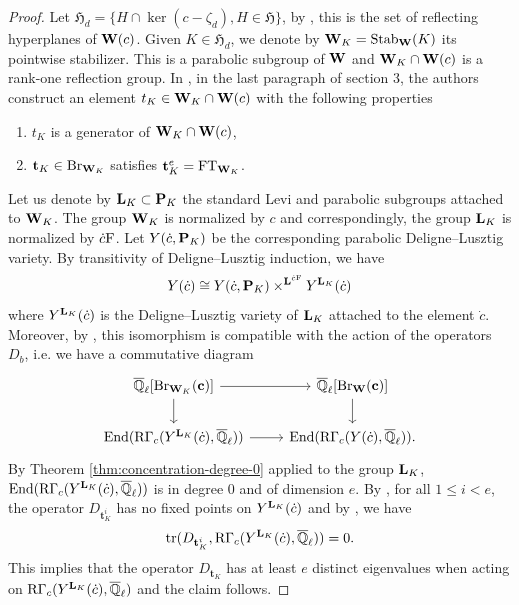 \documentclass[article, 10pt, oneside, reqno]{amsart}
\theoremstyle{plain}
\theoremstyle{definition}
\theoremstyle{remark}
\newcommand{\FT}{\mathrm{FT}}
\newcommand{\Hfrak}{\mathfrak{H}}
\newcommand{\cbf}{\mathbf{c}}
\newcommand{\tbf}{\mathbf{t}}
\begin{document}
\begin{proof}
Let $\Hfrak_d = \{H \cap \ker(c - \zeta_d), H \in \Hfrak \}$, by \cite{SpringerRegularElements}, this is the set of reflecting hyperplanes of $\mathbf{W}(c)$. Given $K \in \Hfrak_d$, we denote by $\mathbf{W}_{K} = \mathrm{Stab}_{\mathbf{W}}(K)$ its pointwise stabilizer. This is a parabolic subgroup of $\mathbf{W}$ and $\mathbf{W}_K \cap \mathbf{W}(c)$ is a rank-one reflection group. In \cite{DigneMichelEndomorphism}, in the last paragraph of section 3, the authors construct an element $t_K \in \mathbf{W}_K \cap \mathbf{W}(c)$ with the following properties 
\begin{enumerate}
\item $t_K$ is a generator of $\mathbf{W}_K \cap \mathbf{W}(c)$, 
\item $\tbf_K \in \Br_{\Wbf_K}$ satisfies $\tbf_K^e = \FT_{\Wbf_K}$.
\end{enumerate}
Let us denote by $\mathbf{L}_K \subset \mathbf{P}_K$ the standard Levi and parabolic subgroups attached to $\mathbf{W}_K$. The group $\mathbf{W}_K$ is normalized by $c$ and correspondingly, the group $\mathbf{L}_K$ is normalized by $\dot{c}\mathrm{F}$. Let $Y(\dot{c}, \mathbf{P}_K)$ be the corresponding parabolic Deligne--Lusztig variety. By transitivity of Deligne--Lusztig induction, we have 
$$Y(\dot{c}) \cong Y(\dot{c}, \mathbf{P}_K) \times^{\mathbf{L}^{\dot{c}\mathrm{F}}} Y^{\mathbf{L}_K}(\dot{c})$$ 
where $Y^{\mathbf{L}_K}(\dot{c})$ is the Deligne--Lusztig variety of $\mathbf{L}_K$ attached to the element $\dot{c}$. Moreover, by \cite[Proposition 5.2.8]{DigneMichelRouquier}, this isomorphism is compatible with the action of the operators $D_b$, i.e. we have a commutative diagram 
\[\begin{tikzcd}
	{\Qlb[\Br_{\Wbf_K}(\cbf)]} & {\Qlb[\Br_{\Wbf}(\cbf)]} \\
	{\End(\RGamma_c(Y^{\Lbf_K}(\dot{c}), \Qlb))} & {\End(\RGamma_c(Y(\dot{c}), \Qlb)).}
	\arrow[from=1-1, to=1-2]
	\arrow[from=1-1, to=2-1]
	\arrow[from=1-2, to=2-2]
	\arrow[from=2-1, to=2-2]
\end{tikzcd}\]
By Theorem \ref{thm:concentration-degree-0} applied to the group $\mathbf{L}_K$, $\mathrm{End}(\mathrm{R\Gamma}_c(Y^{\mathbf{L}_K}(\dot{c}), \overline{\mathbb{Q}}_{\ell}))$ is in degree $0$ and of dimension $e$. By \cite[Proposition 5.2.3]{DigneMichelRouquier}, for all $1 \leq i < e$, the operator $D_{\tbf_K^i}$ has no fixed points on $Y^{\mathbf{L}_K}(\dot{c})$ and by \cite[Proposition 5.2.2]{DigneMichelRouquier}, we have 
$$\tr(D_{\tbf_K^i}, \RGamma_c(Y^{\Lbf_K}(\dot{c}), \Qlb)) = 0.$$
This implies that the operator $D_{\tbf_K}$ has at least $e$ distinct eigenvalues when acting on $\mathrm{R\Gamma}_c(Y^{\mathbf{L}_K}(\dot{c}), \overline{\mathbb{Q}}_{\ell})$ and the claim follows. 
\end{proof}
\end{document}
